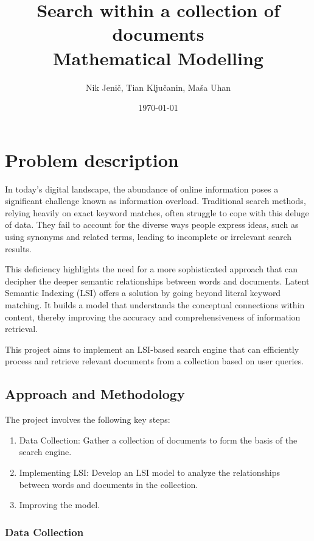 \documentclass[12pt,a4paper]{article}
\title{Search within a collection of documents\\
\normalsize{Mathematical Modelling}
}
\author{Nik Jenič, Tian Ključanin, Maša Uhan}
\date{\today}
\begin{document}
\maketitle
\newpage
\tableofcontents

\newpage
\section{Problem description}

In today's digital landscape, the abundance of online information poses a significant challenge known as information overload. Traditional search methods, relying heavily on exact keyword matches, often struggle to cope with this deluge of data. They fail to account for the diverse ways people express ideas, such as using synonyms and related terms, leading to incomplete or irrelevant search results.

\bigskip
\noindent This deficiency highlights the need for a more sophisticated approach that can decipher the deeper semantic relationships between words and documents. Latent Semantic Indexing (LSI) offers a solution by going beyond literal keyword matching. It builds a model that understands the conceptual connections within content, thereby improving the accuracy and comprehensiveness of information retrieval.

\bigskip
\noindent This project aims to implement an LSI-based search engine that can efficiently process and retrieve relevant documents from a collection based on user queries. 


\subsection{Approach and Methodology}

The project involves the following key steps:

\begin{enumerate}
    \item Data Collection: Gather a collection of documents to form the basis of the search engine.
    \item Implementing LSI: Develop an LSI model to analyze the relationships between words and documents in the collection.
    \item Improving the model.
\end{enumerate}


\subsubsection{Data Collection}
\end{document}
